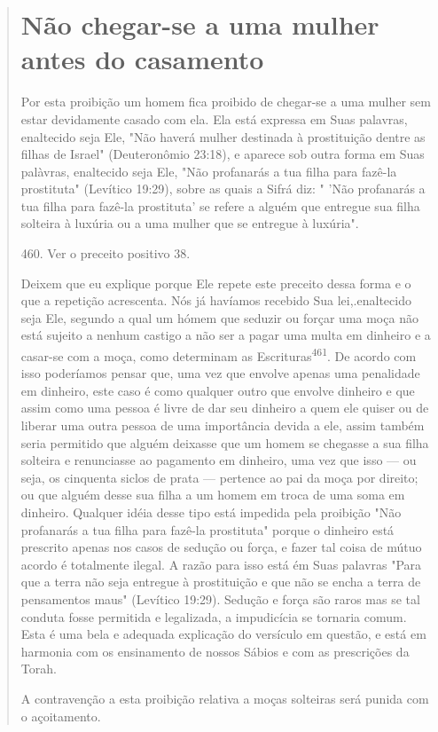 \begin{quote}
\section{Não chegar-se a uma mulher antes do casamento}

Por esta proibição um homem fica proibido de chegar-se a uma mu­lher sem
estar devidamente casado com ela. Ela está expressa em Suas palavras,
enaltecido seja Ele, "Não haverá mulher destinada à prostituição dentre
as fi­lhas de Israel" (Deuteronômio 23:18), e aparece sob outra forma em
Suas palà­vras, enaltecido seja Ele, "Não profanarás a tua filha para
fazê-la prostituta" (Le­vítico 19:29), sobre as quais a Sifrá diz: "
'Não profanarás a tua filha para fazê-la prostituta' se refere a alguém
que entregue sua filha solteira à luxúria ou a uma mulher que se
entregue à luxúria".

460. Ver o preceito positivo 38.

Deixem que eu explique porque Ele repete este preceito dessa forma e o
que a repetição acrescenta. Nós já havíamos recebido Sua
lei,.enaltecido seja Ele, segundo a qual um hómem que
seduzir ou forçar uma moça não está sujeito a nenhum castigo a não ser a
pagar uma multa em dinheiro e a casar-se com a moça, como determinam as
Escrituras\textsuperscript{461}. De acordo com isso poderíamos pen­sar
que, uma vez que envolve apenas uma penalidade em dinheiro, este caso é
como qualquer outro que envolve dinheiro e que assim como uma pessoa é
livre de dar seu dinheiro a quem ele quiser ou de liberar uma outra
pessoa de uma importância devida a ele, assim também seria permitido que
alguém deixas­se que um homem se chegasse a sua filha solteira e
renunciasse ao pagamento em dinheiro, uma vez que isso --- ou seja, os
cinquenta siclos de prata --- perten­ce ao pai da moça por direito; ou
que alguém desse sua filha a um homem em troca de uma soma em dinheiro.
Qualquer idéia desse tipo está impedida pela proibição "Não profanarás a
tua filha para fazê-la prostituta" porque o dinheiro está prescrito
apenas nos casos de sedução ou força, e fazer tal coisa de mútuo acordo
é totalmente ilegal. A razão para isso está ém Suas palavras "Para que a
terra não seja entregue à prostituição e que não se encha a terra de
pensamentos maus" (Levítico 19:29). Sedução e força são raros mas se tal
conduta fosse per­mitida e legalizada, a impudicícia se tornaria comum.
Esta é uma bela e adequa­da explicação do versículo em questão, e está
em harmonia com os ensinamen­to de nossos Sábios e com as prescrições da
Torah.

A contravenção a esta proibição relativa a moças solteiras será puni­da
com o açoitamento.
\end{quote}

